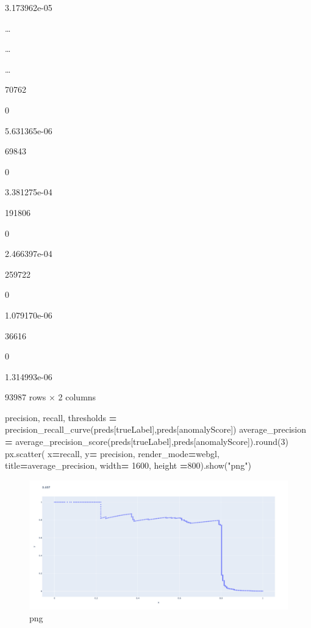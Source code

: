 \documentclass[
]{article}
\newenvironment{Shaded}{\begin{snugshade}}{\end{snugshade}}
\newcommand{\BuiltInTok}[1]{#1}
\newcommand{\DecValTok}[1]{\textcolor[rgb]{0.00,0.00,0.81}{#1}}
\newcommand{\NormalTok}[1]{#1}
\newcommand{\OperatorTok}[1]{\textcolor[rgb]{0.81,0.36,0.00}{\textbf{#1}}}
\newcommand{\StringTok}[1]{\textcolor[rgb]{0.31,0.60,0.02}{#1}}
\begin{document}
3.173962e-05

\ldots{}

\ldots{}

\ldots{}

70762

0

5.631365e-06

69843

0

3.381275e-04

191806

0

2.466397e-04

259722

0

1.079170e-06

36616

0

1.314993e-06

93987 rows × 2 columns

\begin{Shaded}
\begin{Highlighting}[]
\NormalTok{precision, recall, thresholds }\OperatorTok{=}\NormalTok{  precision\_recall\_curve(preds[}\StringTok{\textquotesingle{}trueLabel\textquotesingle{}}\NormalTok{],preds[}\StringTok{\textquotesingle{}anomalyScore\textquotesingle{}}\NormalTok{])}
\NormalTok{average\_precision }\OperatorTok{=}\NormalTok{  average\_precision\_score(preds[}\StringTok{\textquotesingle{}trueLabel\textquotesingle{}}\NormalTok{],preds[}\StringTok{\textquotesingle{}anomalyScore\textquotesingle{}}\NormalTok{]).}\BuiltInTok{round}\NormalTok{(}\DecValTok{3}\NormalTok{)}
\NormalTok{px.scatter( x}\OperatorTok{=}\NormalTok{recall, y}\OperatorTok{=}\NormalTok{ precision, render\_mode}\OperatorTok{=}\StringTok{\textquotesingle{}webgl\textquotesingle{}}\NormalTok{, title}\OperatorTok{=}\NormalTok{average\_precision, width}\OperatorTok{=} \DecValTok{1600}\NormalTok{, height }\OperatorTok{=}\DecValTok{800}\NormalTok{).show(}\StringTok{"png"}\NormalTok{)}
\end{Highlighting}
\end{Shaded}

\begin{figure}
\centering
\includegraphics{mymarkdownfile_files/mymarkdownfile_49_0.png}
\caption{png}
\end{figure}
\end{document}
